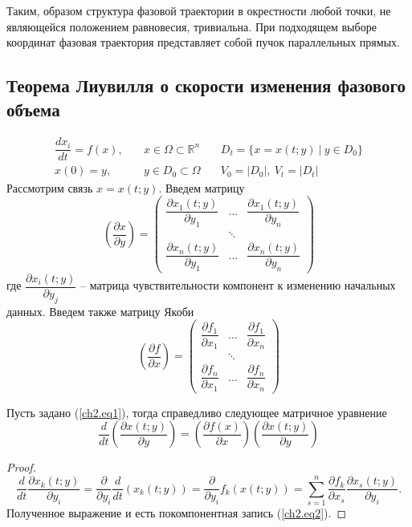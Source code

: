 Таким, образом структура фазовой траектории в окрестности любой точки, не являющейся положением равновесия, тривиальна. При подходящем выборе координат фазовая траектория представляет собой пучок параллельных прямых.
\subsection{Теорема Лиувилля о скорости изменения фазового объема}
\begin{equation}\label{ch2.eq1}
\begin{array}{rcl}
\dfrac{dx_i}{dt}=f(x),\quad &x\in\Omega\subset\mathbb{R}^n\quad &D_t=\{x=x(t;y)\ |\ y\in D_0\} \\
x(0)=y,\quad &y\in D_0\subset\Omega\quad &V_0=|D_0|,\ V_t=|D_t|
\end{array}
\end{equation}
Рассмотрим связь $x=x(t;y)$. Введем матрицу
$$
\left(\dfrac{\partial x}{\partial y}\right) = 
\begin{pmatrix}
\dfrac{\partial x_1(t;y)}{\partial y_1} & \dots & \dfrac{\partial x_1(t;y)}{\partial y_n}\\
& \ddots & \\
\dfrac{\partial x_n(t;y)}{\partial y_1} & \dots & \dfrac{\partial x_n(t;y)}{\partial y_n}
\end{pmatrix}
$$
где $\dfrac{\partial x_i(t;y)}{\partial y_j}$ -- матрица чувствительности компонент к изменению начальных данных. Введем также матрицу Якоби
$$
\left(\dfrac{\partial f}{\partial x}\right) = 
\begin{pmatrix}
\dfrac{\partial f_1}{\partial x_1} & \dots & \dfrac{\partial f_1}{\partial x_n}\\
& \ddots & \\
\dfrac{\partial f_n}{\partial x_1} & \dots & \dfrac{\partial f_n}{\partial x_n}
\end{pmatrix}
$$
\begin{lemma}\label{ch2.lem1}
Пусть задано (\ref{ch2.eq1}), тогда справедливо следующее матричное уравнение
\begin{equation}\label{ch2.eq2}
\dfrac{d}{dt}\left(\dfrac{\partial x(t;y)}{\partial y}\right) = \left(\dfrac{\partial f(x)}{\partial x}\right)\left(\dfrac{\partial x(t;y)}{\partial y}\right)
\end{equation}
\end{lemma}
\begin{proof}
$$
\dfrac{d}{dt}\dfrac{\partial x_k(t;y)}{\partial y_i}=\dfrac{\partial}{\partial y_i}\dfrac{d}{dt}\left(x_k(t;y)\right)= \dfrac{\partial}{\partial y_i}f_k(x(t;y)) = \sum\limits_{s=1}^{n}\dfrac{\partial f_k}{\partial x_s}\dfrac{\partial x_s(t;y)}{\partial y_i}.
$$
Полученное выражение и есть покомпонентная запись (\ref{ch2.eq2}).
\end{proof}
